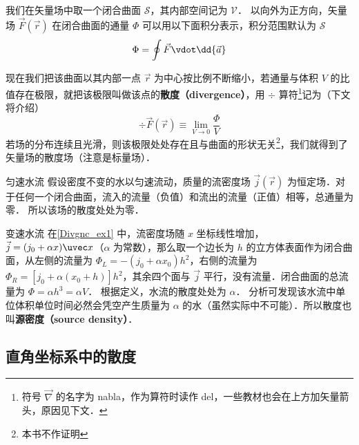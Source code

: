 

我们在矢量场中取一个闭合曲面 $\mathcal{S}$，其内部空间记为 $\mathcal{V}$． 以向外为正方向，矢量场 $\vec F(\vec r)$ 在闭合曲面的通量 $\Phi$ 可以用以下面积分表示，积分范围默认为 $\mathcal{S}$
\begin{equation}
\Phi  = \oint \vec F \vdot \dd{\vec a}
\end{equation}

现在我们把该曲面以其内部一点 $\vec r$ 为中心按比例不断缩小，若通量与体积 $V$ 的比值存在极限，就把该极限叫做该点的\textbf{散度（divergence）}，用 $\div$ 算符\footnote{符号 $\vec\nabla$ 的名字为 nabla，作为算符时读作 del，一些教材也会在上方加矢量箭头，原因见下文．}记为（下文将介绍）
\begin{equation}\label{Divgnc_eq2}
\div \vec F(\vec r) \equiv \lim_{V \to 0} \frac{\Phi }{V}
\end{equation}
若场的分布连续且光滑，则该极限处处存在且与曲面的形状无关\footnote{本书不作证明}，我们就得到了矢量场的散度场（注意是标量场）．

\begin{exam}{匀速水流}\label{Divgnc_ex1}
假设密度不变的水以匀速流动，质量的流密度场 $\vec j(\vec r)$ 为恒定场．对于任何一个闭合曲面，流入的流量（负值）和流出的流量（正值）相等，总通量为零． 所以该场的散度处处为零．
\end{exam}

\begin{exam}{变速水流}
在\autoref{Divgnc_ex1} 中，流密度场随 $x$ 坐标线性增加， $\vec j = (j_0 + \alpha x)\uvec x$（$\alpha$ 为常数），那么取一个边长为 $h$ 的立方体表面作为闭合曲面，从左侧的流量为 $\Phi _L =  - (j_0 + \alpha x_0) h^2$，右侧的流量为 $\Phi _R = [j_0 + \alpha (x_0 + h)] h^2$，其余四个面与 $\vec j$ 平行，没有流量．闭合曲面的总流量为 $\Phi  = \alpha h^3 = \alpha V$． 根据定义，水流的散度处处为 $\alpha$． 分析可发现该水流中单位体积单位时间必然会凭空产生质量为 $\alpha$ 的水（虽然实际中不可能）．所以散度也叫\textbf{源密度（source density）}．
\end{exam}

\subsection{直角坐标系中的散度}

